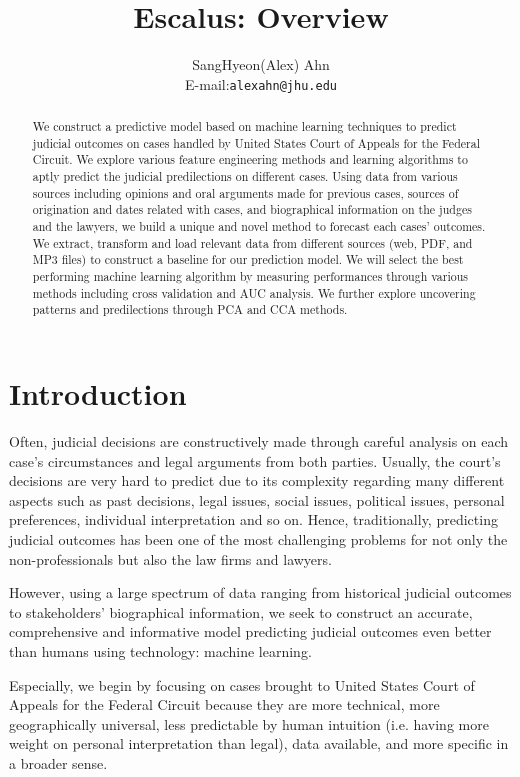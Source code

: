 \documentclass{article} %
\title{Escalus: Overview}
\author{
SangHyeon(Alex) Ahn\\
E-mail:\texttt{alexahn@jhu.edu} \\
}
\begin{document}
\raggedbottom
\maketitle

\begin{abstract}
We construct a predictive model based on machine learning techniques to predict judicial outcomes on cases handled by United States Court of Appeals for the Federal Circuit. We explore various feature engineering methods and learning algorithms to aptly predict the judicial predilections on different cases. Using data from various sources including opinions and oral arguments made for previous cases, sources of origination and dates related with cases, and biographical information on the judges and the lawyers, we build a unique and novel method to forecast each cases'  outcomes. We extract, transform and load relevant data from different sources (web, PDF, and MP3 files) to construct a baseline for our prediction model. We will select the best performing machine learning algorithm by measuring performances through various methods including cross validation and AUC analysis. We further explore uncovering patterns and predilections through PCA and CCA methods.
\end{abstract}

\section{Introduction}
Often, judicial decisions are constructively made through careful analysis on each case's circumstances and legal arguments from both parties. Usually, the court's decisions are very hard to predict due to its complexity regarding many different aspects such as past decisions, legal issues, social issues, political issues, personal preferences, individual interpretation and so on. Hence, traditionally, predicting judicial outcomes has been one of the most challenging problems for not only the non-professionals but also the law firms and lawyers. 

However, using a large spectrum of data ranging from historical judicial outcomes to stakeholders' biographical information, we seek to construct an accurate, comprehensive and informative model predicting judicial outcomes even better than humans using technology: machine learning.

Especially, we begin by focusing on cases brought to United States Court of Appeals for the Federal Circuit because they are more technical, more geographically universal, less predictable by human intuition (i.e. having more weight on personal interpretation than legal), data available, and more specific in a broader sense.
\end{document}
